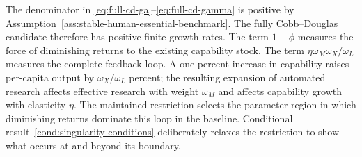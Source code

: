 The denominator in \eqref{eq:full-cd-ga}--\eqref{eq:full-cd-gamma} is positive by
Assumption~\ref{ass:stable-human-essential-benchmark}. The fully Cobb--Douglas
candidate therefore has positive finite growth rates.
The term $1-\phi$ measures the force of diminishing returns to the existing
capability stock. The term
$\eta\omega_M\omega_X/\omega_L$ measures the complete feedback loop. A one-percent
increase in capability raises per-capita output by $\omega_X/\omega_L$ percent;
the resulting expansion of automated research affects effective research with
weight $\omega_M$ and affects capability growth with elasticity $\eta$. The maintained
restriction selects the parameter region in which diminishing returns dominate this
loop in the baseline. Conditional result~\ref{cond:singularity-conditions}
deliberately relaxes the restriction to show what occurs at and beyond its boundary.


